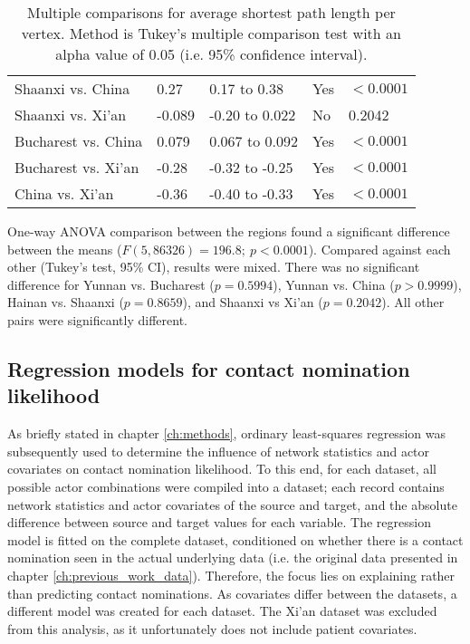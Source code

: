 \begin{table}[htbp]
\begin{mdframed}
\begin{tabular*}{\linewidth}{l|llll}
			Shaanxi vs. China & 0.27 & 0.17 to 0.38 & Yes & $<0.0001$\\
			Shaanxi vs. Xi'an & -0.089 & -0.20 to 0.022 & No & 0.2042\\
			Bucharest vs. China & 0.079 & 0.067 to 0.092 & Yes & $<0.0001$\\
			Bucharest vs. Xi'an & -0.28 & -0.32 to -0.25 & Yes & $<0.0001$\\
			China vs. Xi'an & -0.36 & -0.40 to -0.33 & Yes & $<0.0001$\\
			\hline
		\end{tabular*}
		\caption{Multiple comparisons for average shortest path length per vertex. Method is Tukey's multiple comparison test with an alpha value of 0.05 (i.e. 95\% confidence interval).}
		\label{tab:avg_shortest_path_tukey}
	\end{mdframed}
\end{table}

One-way ANOVA comparison between the regions found a significant difference between the means ($F(5,86326)=196.8; \: p<0.0001$). Compared against each other (Tukey's test, 95\% CI), results were mixed. There was no significant difference for Yunnan vs. Bucharest ($p=0.5994$), Yunnan vs. China ($p>0.9999$), Hainan vs. Shaanxi ($p=0.8659$), and Shaanxi vs Xi'an ($p=0.2042$). All other pairs were significantly different.

\subsection{Regression models for contact nomination likelihood}
\label{sec:sna_regression}

As briefly stated in chapter \ref{ch:methods}, ordinary least-squares regression was subsequently used to determine the influence of network statistics and actor covariates on contact nomination likelihood. To this end, for each dataset, all possible actor combinations were compiled into a dataset; each record contains network statistics and actor covariates of the source and target, and the absolute difference between source and target values for each variable. The regression model is fitted on the complete dataset, conditioned on whether there is a contact nomination seen in the actual underlying data (i.e. the original data presented in chapter \ref{ch:previous_work_data}). Therefore, the focus lies on explaining rather than predicting contact nominations. As covariates differ between the datasets, a different model was created for each dataset. The Xi'an dataset was excluded from this analysis, as it unfortunately does not include patient covariates.

